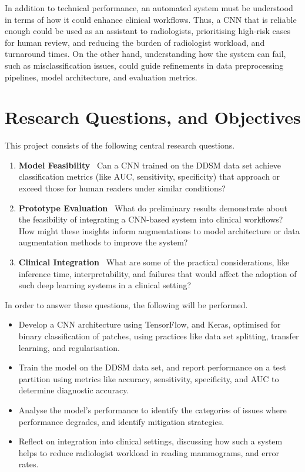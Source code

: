 \documentclass[main]{subfiles}
\begin{document}
In addition to technical performance, an automated system must be understood in terms of how it could enhance clinical workflows. Thus, a CNN that is reliable enough could be used as an assistant to radiologists, prioritising high-risk cases for human review, and reducing the burden of radiologist workload, and turnaround times. On the other hand, understanding how the system can fail, such as misclassification issues, could guide refinements in data preprocessing pipelines, model architecture, and evaluation metrics.

\section{Research Questions, and Objectives}
\label{sec:intro_research_questions}
This project consists of the following central research questions.

\begin{enumerate}
    \label{rq:intro}
    \item \textbf{Model Feasibility} \textemdash\ Can a CNN trained on the DDSM data set achieve classification metrics (like AUC, sensitivity, specificity) that approach or exceed those for human readers under similar conditions? \label{rq:model_feasibility}
    \item \textbf{Prototype Evaluation} \textemdash\ What do preliminary results demonstrate about the feasibility of integrating a CNN-based system into clinical workflows? How might these insights inform augmentations to model architecture or data augmentation methods to improve the system? \label{rq:prototype_evaluation}
    \item \textbf{Clinical Integration} \textemdash\ What are some of the practical considerations, like inference time, interpretability, and failures that would affect the adoption of such deep learning systems in a clinical setting? \label{rq:clinical_integration}
\end{enumerate}

In order to answer these questions, the following will be performed.

\begin{itemize}
	\item Develop a CNN architecture using TensorFlow, and Keras, optimised for binary classification of patches, using practices like data set splitting, transfer learning, and regularisation.
	\item Train the model on the DDSM data set, and report performance on a test partition using metrics like accuracy, sensitivity, specificity, and AUC to determine diagnostic accuracy.
	\item Analyse the model's performance to identify the categories of issues where performance degrades, and identify mitigation strategies.
	\item Reflect on integration into clinical settings, discussing how such a system helps to reduce radiologist workload in reading mammograms, and error rates.
\end{itemize}
\end{document}
